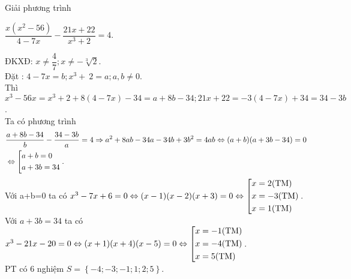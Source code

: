 \begin{ex}%
    Giải phương trình
    \begin{center}
    	$\dfrac{x(x^2-56)}{4-7x}-\dfrac{21x+22}{x^3+2}=4$.
    \end{center}
\loigiai
    {ĐKXĐ: $x\ne \dfrac{4}{7}; x\ne -\sqrt[3]{2}$.\\
    	Đặt : $4-7x=b; x^3+\ 2= a; a, b\neq 0$.\\
    	Thì $x^3-56x={{x}^{3}}+2+8(4-7x)-34=a+8b-34;21x+22=-3(4-7x)+34=34-3b$.\\
    	Ta có phương trình 
    	\begin{align*}
    	& \dfrac{a+8b-34}{b}-\dfrac{34-3b}{a}=4\Rightarrow {{a}^{2}}+8ab-34a-34b+3{{b}^{2}}=4ab\Leftrightarrow (a+b)(a+3b-34)=0 \\ 
    	& \Leftrightarrow \left[\begin{aligned}
    		& a+b=0 \\ 
    		& a+3b=34\end{aligned}\right..
    	\end{align*}
    	Với a+b=0 ta có 
    	$ {{x}^{3}}-7x+6=0\Leftrightarrow (x-1)(x-2)(x+3)=0\Leftrightarrow\left[\begin{aligned}	& x=2(\text{TM}) \\ 
    		& x=-3(\text{TM}) \\ 
    		& x=1(\text{TM})\end{aligned}\right. $.\\
    	Với $a+3b=34$ ta có ${{x}^{3}}-21x-20=0\Leftrightarrow (x+1)(x+4)(x-5)=0\Leftrightarrow\left[\begin{aligned}& x=-1(\text{TM}) \\ & x=-4(\text{TM}) \\ & x=5(\text{TM})\end{aligned}\right. $.\\
    	PT có 6 nghiệm $S=\left\{-4;-3;-1;1;2;5 \right\}$.
    }
\end{ex}

